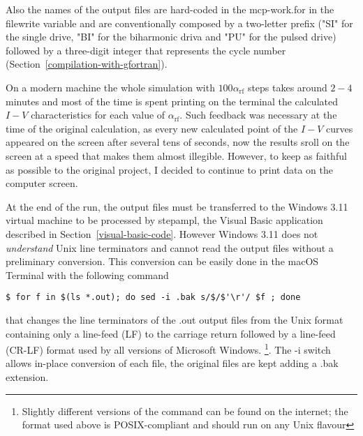 Also the names of the output files are hard-coded in the \textsf{mcp-work.for} in the \textsf{filewrite} variable and are conventionally composed by a two-letter prefix ("SI" for the single drive, "BI" for the biharmonic driva and "PU" for the pulsed drive) followed by a three-digit integer that represents the cycle number (Section~\ref{compilation-with-gfortran}).

On a modern machine the whole simulation with $100 \alpha_\mathrm{rf}$ steps takes around $2 - 4$ minutes and most of the time is spent printing on the terminal the calculated $I - V$ characteristics for each value of $\alpha_\mathrm{rf}$. Such feedback was necessary at the time of the original calculation, as every new calculated point of the $I - V$ curves appeared on the screen after several tens of seconds, now the results sroll on the screen at a speed that makes them almost illegible.
However, to keep as faithful as possible to the original project, I decided to continue to print data on the computer screen.

At the end of the run, the output files must be transferred to the Windows 3.11 virtual machine to be processed by \textsf{stepampl}, the Visual Basic application described in Section~\ref{visual-basic-code}. However Windows 3.11 does not \emph{understand} Unix line terminators and cannot read the output files without a preliminary conversion. 
This conversion can be easily done in the macOS Terminal with the following command

\begin{lstlisting}
$ for f in $(ls *.out); do sed -i .bak s/$/$'\r'/ $f ; done
\end{lstlisting}

that changes the line terminators of the \textsf{.out} output files from the Unix format containing only a line-feed (LF) to the carriage return followed by a line-feed (CR-LF) format used by all versions of Microsoft Windows. 
\footnote{Slightly different versions of the command can be found on the internet; the format used above is POSIX-compliant and should run on any Unix flavour}.
The \textsf{-i} switch allows in-place conversion of each file, the original files are kept adding a \textsf{.bak} extension.

